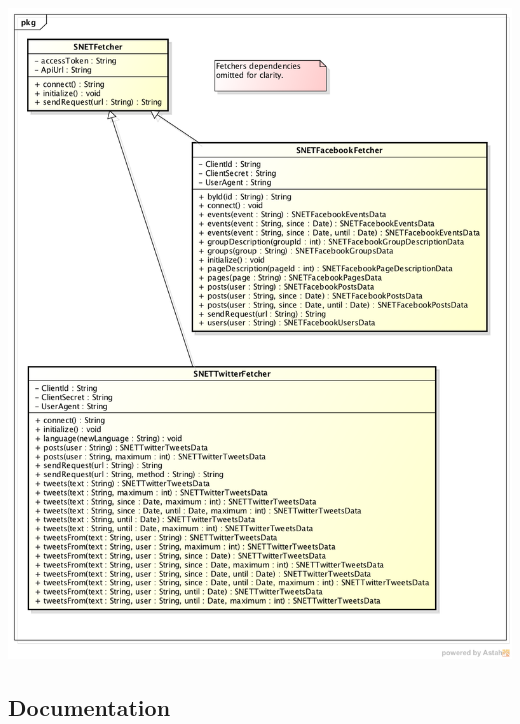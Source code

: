 \begin{center}
\includegraphics[width=.9\linewidth]{./figures/SocialNetIO-2.png}
\end{center}
\subsection{Documentation}
\label{sec-1-4}
